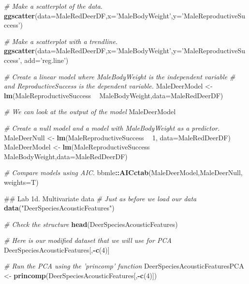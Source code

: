 \documentclass[]{book}
\newenvironment{Shaded}{\begin{snugshade}}{\end{snugshade}}
\newcommand{\CommentTok}[1]{\textcolor[rgb]{0.56,0.35,0.01}{\textit{#1}}}
\newcommand{\DataTypeTok}[1]{\textcolor[rgb]{0.13,0.29,0.53}{#1}}
\newcommand{\DecValTok}[1]{\textcolor[rgb]{0.00,0.00,0.81}{#1}}
\newcommand{\KeywordTok}[1]{\textcolor[rgb]{0.13,0.29,0.53}{\textbf{#1}}}
\newcommand{\NormalTok}[1]{#1}
\newcommand{\OperatorTok}[1]{\textcolor[rgb]{0.81,0.36,0.00}{\textbf{#1}}}
\newcommand{\StringTok}[1]{\textcolor[rgb]{0.31,0.60,0.02}{#1}}
\begin{document}
\begin{Shaded}
\begin{Highlighting}[]
\CommentTok{# Make a scatterplot of the data.}
\KeywordTok{ggscatter}\NormalTok{(}\DataTypeTok{data=}\NormalTok{MaleRedDeerDF,}\DataTypeTok{x=}\StringTok{'MaleBodyWeight'}\NormalTok{,}\DataTypeTok{y=}\StringTok{'MaleReproductiveSuccess'}\NormalTok{)}

\CommentTok{# Make a scatterplot with a trendline.}
\KeywordTok{ggscatter}\NormalTok{(}\DataTypeTok{data=}\NormalTok{MaleRedDeerDF,}\DataTypeTok{x=}\StringTok{'MaleBodyWeight'}\NormalTok{,}\DataTypeTok{y=}\StringTok{'MaleReproductiveSuccess'}\NormalTok{,}
          \DataTypeTok{add=}\StringTok{'reg.line'}\NormalTok{)}

\CommentTok{# Create a linear model where MaleBodyWeight is the independent variable}
\CommentTok{# and ReproductiveSuccess is the dependent variable.}
\NormalTok{MaleDeerModel <-}\StringTok{ }\KeywordTok{lm}\NormalTok{(MaleReproductiveSuccess }\OperatorTok{~}\StringTok{ }\NormalTok{MaleBodyWeight,}\DataTypeTok{data=}\NormalTok{MaleRedDeerDF)}

\CommentTok{# We can look at the output of the model  }
\NormalTok{MaleDeerModel}

\CommentTok{# Create a null model and a model with MaleBodyWeight as a predictor.}
\NormalTok{MaleDeerNull <-}\StringTok{ }\KeywordTok{lm}\NormalTok{(MaleReproductiveSuccess }\OperatorTok{~}\StringTok{ }\DecValTok{1}\NormalTok{, }\DataTypeTok{data=}\NormalTok{MaleRedDeerDF)}
\NormalTok{MaleDeerModel <-}\StringTok{ }\KeywordTok{lm}\NormalTok{(MaleReproductiveSuccess }\OperatorTok{~}\StringTok{ }\NormalTok{MaleBodyWeight,}\DataTypeTok{data=}\NormalTok{MaleRedDeerDF)}

\CommentTok{# Compare models using AIC.}
\NormalTok{bbmle}\OperatorTok{::}\KeywordTok{AICctab}\NormalTok{(MaleDeerModel,MaleDeerNull, }\DataTypeTok{weights=}\NormalTok{T)}

\NormalTok{## Lab 1d. Multivariate data}
\CommentTok{# Just as before we load our data}
\KeywordTok{data}\NormalTok{(}\StringTok{"DeerSpeciesAcousticFeatures"}\NormalTok{)}

\CommentTok{# Check the structure}
\KeywordTok{head}\NormalTok{(DeerSpeciesAcousticFeatures)}

\CommentTok{# Here is our modified dataset that we will use for PCA}
\NormalTok{DeerSpeciesAcousticFeatures[,}\OperatorTok{-}\KeywordTok{c}\NormalTok{(}\DecValTok{4}\NormalTok{)] }

\CommentTok{# Run the PCA using the 'princomp' function}
\NormalTok{DeerSpeciesAcousticFeaturesPCA <-}\StringTok{ }\KeywordTok{princomp}\NormalTok{(DeerSpeciesAcousticFeatures[,}\OperatorTok{-}\KeywordTok{c}\NormalTok{(}\DecValTok{4}\NormalTok{)])}


\end{Highlighting}
\end{Shaded}
\end{document}
